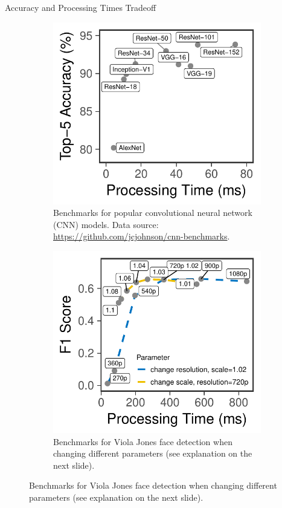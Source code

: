\begin{frame}[t]{Accuracy and Processing Times Tradeoff}
  \begin{figure}
    \pause
    \begin{subfigure}[t]{0.45\textwidth}
      \centering
      \includegraphics[width=0.95\linewidth]{figures/motiv-functions.pdf}
      \caption{Benchmarks for popular convolutional neural network (CNN)
        models. Data source: \url{https://github.com/jcjohnson/cnn-benchmarks}.}
    \end{subfigure}
    \hfill
    \pause
    \begin{subfigure}[t]{0.45\textwidth}
      \centering
      \includegraphics[width=0.95\linewidth]{figures/motiv-params.pdf}
      \caption{Benchmarks for Viola Jones face detection when changing different
        parameters (see explanation on the next slide).}
    \end{subfigure}
  \end{figure}
\end{frame}

